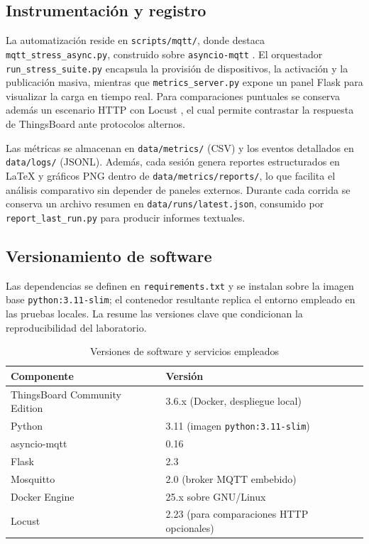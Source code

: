 ﻿\documentclass[conference]{IEEEtran}
\begin{document}
\subsection{Instrumentaci\'on y registro}

La automatizaci\'on reside en \texttt{scripts/mqtt/}, donde destaca \texttt{mqtt\_stress\_async.py}, construido sobre \texttt{asyncio-mqtt} \cite{asyncio-mqtt}. El orquestador \texttt{run\_stress\_suite.py} encapsula la provisi\'on de dispositivos, la activaci\'on y la publicaci\'on masiva, mientras que \texttt{metrics\_server.py} expone un panel Flask para visualizar la carga en tiempo real. Para comparaciones puntuales se conserva adem\'as un escenario HTTP con Locust \cite{locust-docs}, el cual permite contrastar la respuesta de ThingsBoard ante protocolos alternos.

Las m\'etricas se almacenan en \texttt{data/metrics/} (CSV) y los eventos detallados en \texttt{data/logs/} (JSONL). Adem\'as, cada sesi\'on genera reportes estructurados en LaTeX y gr\'aficos PNG dentro de \texttt{data/metrics/reports/}, lo que facilita el an\'alisis comparativo sin depender de paneles externos. Durante cada corrida se conserva un archivo resumen en \texttt{data/runs/latest.json}, consumido por \texttt{report\_last\_run.py} para producir informes textuales.

\subsection{Versionamiento de software}
Las dependencias se definen en \texttt{requirements.txt} y se instalan sobre la imagen base \texttt{python:3.11-slim}; el contenedor resultante replica el entorno empleado en las pruebas locales. La  resume las versiones clave que condicionan la reproducibilidad del laboratorio.

\begin{table}[!t]
\centering
\caption{Versiones de software y servicios empleados}
\label{tab:software}
\begin{tabular}{@{}ll@{}}
\toprule
Componente & Versi\'on \\
\midrule
ThingsBoard Community Edition & 3.6.x (Docker, despliegue local) \\
Python & 3.11 (imagen \texttt{python:3.11-slim}) \\
asyncio-mqtt & 0.16 \\
Flask & 2.3 \\
Mosquitto & 2.0 (broker MQTT embebido) \\
Docker Engine & 25.x sobre GNU/Linux \\
Locust & 2.23 (para comparaciones HTTP opcionales) \\
\bottomrule
\end{tabular}
\end{table}
\end{document}
